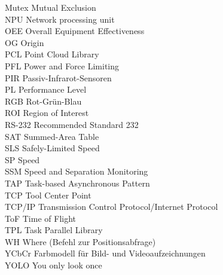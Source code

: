 \documentclass[12pt,a4paper]{report}
\begin{document}
\begin{tabbing}
	Mutex \> Mutual Exclusion \\
	NPU \> Network processing unit\\
	OEE \> Overall Equipment Effectiveness \\
	OG \> Origin\\
	PCL \> Point Cloud Library \\
	PFL \> Power and Force Limiting \\
	PIR \> Passiv-Infrarot-Sensoren\\
	PL \> Performance Level \\
	RGB \> Rot-Grün-Blau\\
	ROI \> Region of Interest \\
	RS-232 \> Recommended Standard 232 \\
	SAT \> Summed-Area Table \\
	SLS \> Safely-Limited Speed \\
	SP \> Speed \\
	SSM \> Speed and Separation Monitoring \\
	TAP \> Task-based Asynchronous Pattern \\
	TCP \> Tool Center Point \\
	TCP/IP \> Transmission Control Protocol/Internet Protocol \\
	ToF \> Time of Flight \\
	TPL \> Task Parallel Library \\
	WH \> Where (Befehl zur Positionsabfrage)\\
	YCbCr \> Farbmodell für Bild- und Videoaufzeichnungen\\
	YOLO \> You only look once
	
\end{tabbing}



\newpage

\renewcommand{\baselinestretch}{1.3}
\small\normalsize

\listoffigures

\renewcommand{\baselinestretch}{1}
\small\normalsize

\newpage

\end{document}
